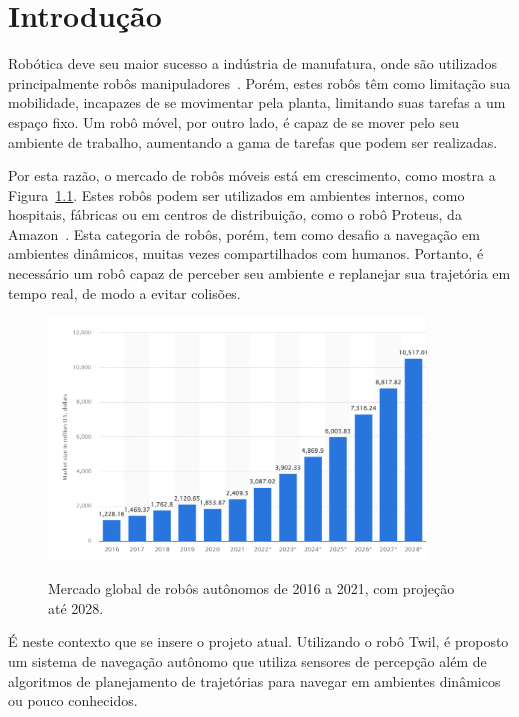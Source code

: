 \documentclass[repeatfields,xlists,xpacks,oneside,yearsonly]{ufrgscca}
\begin{document}
\tableofcontents

\chapter{Introdução}

Robótica deve seu maior sucesso a indústria de manufatura, onde são utilizados
principalmente robôs manipuladores~\cite{IntroductionToMobileRobots}.
Porém, estes robôs têm como limitação sua mobilidade, incapazes de se movimentar
pela planta, limitando suas tarefas a um espaço fixo.
Um robô móvel, por outro lado, é capaz de se mover pelo seu ambiente de
trabalho, aumentando a gama de tarefas que podem ser realizadas.

Por esta razão, o mercado de robôs móveis está em crescimento, como mostra a
Figura~\ref{fig:mercado_robo}.
Estes robôs podem ser utilizados em ambientes internos, como hospitais, fábricas
ou em centros de distribuição, como o robô Proteus, da Amazon~\cite{amazon_robot}.
Esta categoria de robôs, porém, tem como desafio a navegação em ambientes dinâmicos,
muitas vezes compartilhados com humanos.
Portanto, é necessário um robô capaz de perceber seu ambiente e replanejar sua
trajetória em tempo real, de modo a evitar colisões.

\begin{figure}[htbp]
    {
        \centering
        \caption{Mercado global de robôs autônomos de 2016 a 2021, com projeção até 2028.}
        \label{fig:mercado_robo}
        \includegraphics[width=0.9\textwidth]{mercado_robo}\\
    }
    {}
\end{figure}

É neste contexto que se insere o projeto atual.
Utilizando o robô Twil, é proposto um sistema de navegação autônomo que utiliza
sensores de percepção além de algoritmos de planejamento de trajetórias para
navegar em ambientes dinâmicos ou pouco conhecidos.
\end{document}
